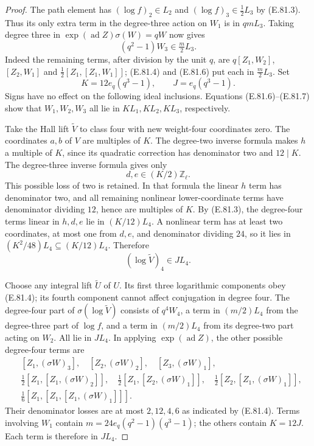 \begin{proof}
The path element has $(\log f)_2\in L_2$ and
$(\log f)_3\in\frac12L_3$ by (E.81.3).
Thus its only extra term in the degree-three action on $W_1$
is in $qmL_3$. Taking degree three in
$\exp(\operatorname{ad}Z)\sigma(W)=qW$ now gives
\[
 (q^2-1)W_3\in\tfrac m2L_3.
 \tag{E.81.7}
\]
Indeed the remaining terms, after division by the unit $q$,
are $q[Z_1,W_2]$, $[Z_2,W_1]$ and
$\frac12[Z_1,[Z_1,W_1]]$; (E.81.4) and (E.81.6)
put each in $\frac m2L_3$.
Set
\[
 K=12e_q(q^3-1),\qquad J=e_q(q^3-1).
 \tag{E.81.8}
\]
Signs have no effect on the following ideal inclusions.
Equations (E.81.6)--(E.81.7) show that $W_1,W_2,W_3$ all
lie in $KL_1,KL_2,KL_3$, respectively.

Take the Hall lift $\widetilde V$ to class four with new
weight-four coordinates zero. The coordinates $a,b$ of $V$
are multiples of $K$. The degree-two inverse formula makes
$h$ a multiple of $K$, since its quadratic correction has
denominator two and $12\mid K$. The degree-three inverse
formula gives only
\[
                            d,e\in(K/2)\mathbb Z_\ell.
\]
This possible loss of two is retained. In that formula the
linear $h$ term has denominator two, and all remaining
nonlinear lower-coordinate terms have denominator dividing
$12$, hence are multiples of $K$. By (E.81.3), the degree-four
terms linear in $h,d,e$ lie in $(K/12)L_4$. A nonlinear
term has at least two coordinates, at most one from $d,e$,
and denominator dividing $24$, so it lies in
$(K^2/48)L_4\subseteq(K/12)L_4$. Therefore
\[
                    (\log\widetilde V)_4\in JL_4.
 \tag{E.81.9}
\]

Choose any integral lift $\widetilde U$ of $U$. Its first three
logarithmic components obey (E.81.4); its fourth component
cannot affect conjugation in degree four. The degree-four part
of $\sigma(\log\widetilde V)$ consists of $q^4W_4$,
a term in $(m/2)L_4$ from the degree-three part of $\log f$,
and a term in $(m/2)L_4$ from its degree-two part acting on
$W_2$. All lie in $JL_4$. In applying
$\exp(\operatorname{ad}Z)$, the other possible degree-four
terms are
\[
\begin{split}
 &[Z_1,(\sigma W)_3],\quad[Z_2,(\sigma W)_2],
       \quad[Z_3,(\sigma W)_1],\\
 &\tfrac12[Z_1,[Z_1,(\sigma W)_2]],\quad
   \tfrac12[Z_1,[Z_2,(\sigma W)_1]],\quad
   \tfrac12[Z_2,[Z_1,(\sigma W)_1]],\\
 &\tfrac16[Z_1,[Z_1,[Z_1,(\sigma W)_1]]].
\end{split}
\]
Their denominator losses are at most $2,12,4,6$ as indicated
by (E.81.4). Terms involving $W_1$ contain $m=24e_q(q^2-1)(q^3-1)$;
the others contain $K=12J$. Each term is therefore in $JL_4$.


\end{proof}
